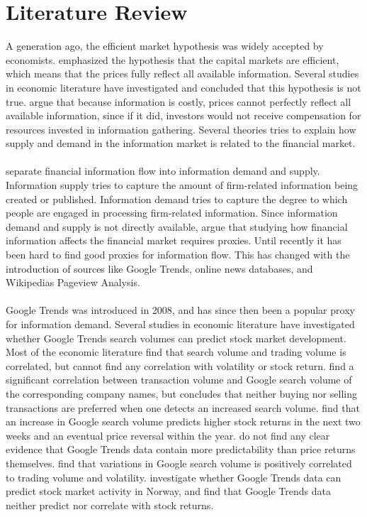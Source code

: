 
\chapter{Literature Review}
A generation ago, the efficient market hypothesis was widely accepted by economists. \cite{fama} emphasized the hypothesis that the capital markets are efficient, which means that the prices fully reflect all available information. Several studies in economic literature have investigated and concluded that this hypothesis is not true. \cite{grossman} argue that because information is costly, prices cannot perfectly reflect all available information, since if it did, investors would  not receive compensation for resources invested in information gathering. Several theories tries to explain how supply and demand in the information market is related to the financial market. 
\\\\
\cite{vlastakis} separate financial information flow into information demand and supply. Information supply tries to capture the amount of firm-related information being created or published. Information demand tries to capture the degree to which people are engaged in processing firm-related information. Since information demand and supply is not directly available, \cite{vlastakis} argue that studying how financial information affects the financial market requires proxies. Until recently it has been hard to find good proxies for information flow. This has changed with the introduction of sources like Google Trends, online news databases, and Wikipedias Pageview Analysis.  
\\\\
Google Trends was introduced in 2008, and has since then been a popular proxy for information demand. Several studies in economic literature have investigated whether Google Trends search volumes can predict stock market development. Most of the economic literature find that search volume and trading volume is correlated, but cannot find any correlation with volatility or stock return. \cite{preis} find a significant correlation between transaction volume and Google search volume of the corresponding company names, but concludes that neither buying nor selling transactions are preferred when one detects an increased search volume. \cite{engelberg} find that an increase in Google search volume predicts higher stock returns in the next two weeks and an eventual price reversal within the year. \cite{challet2014} do not find any clear evidence that Google Trends data contain more predictability than price returns themselves. \cite{vlastakis} find that variations in Google search volume is positively correlated to trading volume and volatility. \cite{neri} investigate whether Google Trends data can predict stock market activity in Norway, and find that Google Trends data neither predict nor correlate with stock returns. 
